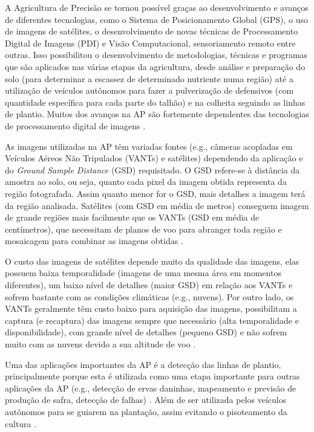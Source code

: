 \documentclass[12pt, a4paper, english, brazil]{article}
\begin{document}
A Agricultura de Precisão se tornou possível graças ao desenvolvimento e avanços de diferentes tecnologias, como o Sistema de Posicionamento Global (GPS), o uso de imagens de satélites, o desenvolvimento de novas técnicas de Processamento Digital de Imagens (PDI) e Visão Computacional, sensoriamento remoto entre outras. Isso possibilitou o desenvolvimento de metodologias, técnicas e programas que são aplicados nas várias etapas da agricultura, desde análise e preparação do solo (para determinar a escassez de determinado nutriente numa região) até a utilização de veículos autônomos para fazer a pulverização de defensivos (com quantidade específica para cada parte do talhão) e na colheita seguindo as linhas de plantio. Muitos dos avanços na AP são fortemente dependentes das tecnologias de processamento digital de imagens \cite{Bolfe_2020}.

As imagens utilizadas na AP têm variadas fontes (e.g., câmeras acopladas em Veículos Aéreos Não Tripulados (VANTs) e satélites) dependendo da aplicação e do \textit{Ground Sample Distance} (GSD) requisitado. O GSD refere-se à distância da amostra ao solo, ou seja, quanto cada pixel da imagem obtida representa da região fotografada. Assim quanto menor for o GSD, mais detalhes a imagem terá da região analisada. Satélites (com GSD em média de metros) conseguem imagem de grande regiões mais facilmente que os VANTs (GSD em média de centímetros), que necessitam de planos de voo para abranger toda região e mosaicagem para combinar as imagens obtidas \cite{Messina_2020}.

O custo das imagens de satélites depende muito da qualidade das imagens, elas possuem baixa temporalidade (imagens de uma mesma área em momentos diferentes), um baixo nível de detalhes (maior GSD) em relação aos VANTs e sofrem bastante com as condições climáticas (e.g., nuvens). Por outro lado, os VANTs geralmente têm custo baixo para aquisição das imagens, possibilitam a captura (e recaptura) das imagens sempre que necessário (alta temporalidade e disponibilidade), com grande nível de detalhes (pequeno GSD) e não sofrem muito com as nuvens devido a sua altitude de voo \cite{Candiago_2015, Delavarpour_2021}.

Uma das aplicações importantes da AP é a detecção das linhas de plantio, principalmente porque esta é utilizada como uma etapa importante para outras aplicações da AP (e.g., detecção de ervas daninhas, mapeamento e previsão de produção de safra, detecção de falhas) \cite{Hassanein_2019}. Além de ser utilizada pelos veículos autônomos para se guiarem na plantação, assim evitando o pisoteamento da cultura \cite{Doha_2021}.
\end{document}
